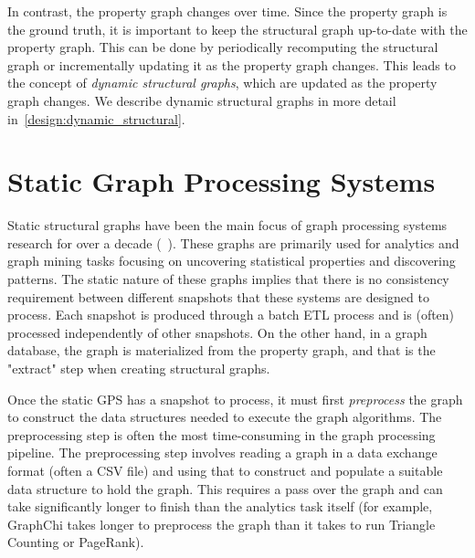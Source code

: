In contrast, the property graph changes over time.
Since the property graph is the ground truth, it is important to keep the structural graph up-to-date with the property graph.
This can be done by periodically recomputing the structural graph or incrementally updating it as the property graph changes.
This leads to the concept of \emph{dynamic structural graphs}, which are updated as the property graph changes.
We describe dynamic structural graphs in more detail in~\autoref{design:dynamic_structural}.


\section{Static Graph Processing Systems}
\label{design:static_structural}

Static structural graphs have been the main focus of graph processing systems research for over a decade (~\cite{malewicz2010pregel,gonzalez2014graphx, zhu2016gemini, xing2015petuum, low2012distributed,gonzalez2012powergraph, powerlyra2019,shun2013ligra, nguyen2013lightweight, zhu2016gemini, graphmat, lakhotia2020gpop, beamer2015gap, kim2022blaze, ai2018clip,zheng2015flashgraph}).
These graphs are primarily used for analytics and graph mining tasks focusing on uncovering statistical properties and discovering patterns.
The static nature of these graphs implies that there is no consistency requirement between different snapshots that these systems are designed to process.
Each snapshot is produced through a batch \ac{ETL} process and is (often) processed independently of other snapshots.
On the other hand, in a graph database, the graph is materialized from the property graph, and that is the "extract" step when creating structural graphs.

Once the static GPS has a snapshot to process, it must first \emph{preprocess} the graph to construct the data structures needed to execute the graph algorithms.
The preprocessing step is often the most time-consuming in the graph processing pipeline.
The preprocessing step involves reading a graph in a data exchange format (often a CSV file) and using that to construct and populate a suitable data structure to hold the graph.
This requires a pass over the graph and can take significantly longer to finish than the analytics task itself (for example, GraphChi takes longer to preprocess the graph than it takes to run Triangle Counting or PageRank).

